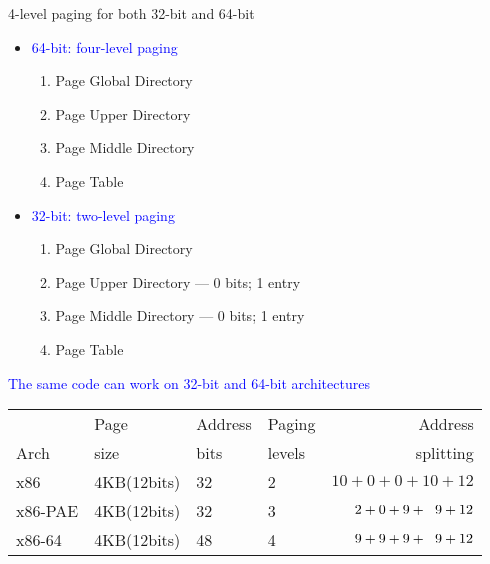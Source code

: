 \begin{frame}%
  \begin{block}{4-level paging for both 32-bit and 64-bit}
    \begin{itemize}
    \item \textcolor{blue}{64-bit: four-level paging}
      \begin{enumerate}
      \item Page Global Directory
      \item Page Upper Directory
      \item Page Middle Directory
      \item Page Table
      \end{enumerate}
    \item \textcolor{blue}{32-bit: two-level paging}
      \begin{enumerate}
      \item Page Global Directory
      \item Page Upper Directory --- 0 bits; 1 entry
      \item Page Middle Directory --- 0 bits; 1 entry
      \item Page Table
      \end{enumerate}
    \end{itemize}
    \textcolor{blue}{The same code can work on 32-bit and 64-bit architectures}
  \end{block}
    \begin{center}
    \begin{scriptsize}
      \begin{tabular}{llllr}
        \hline
        &Page &Address&Paging&Address\\
        Arch&size &bits &levels&splitting\\\hline
        x86 &4KB(12bits) &32 &2 &$10+0+0+10+12$\\\hline
        x86-PAE&4KB(12bits)&32&3&$2+0+9+\hspace{.6em}9+12$\\\hline
        x86-64&4KB(12bits)&48&4&$9+9+9+\hspace{.6em}9+12$\\\hline    
      \end{tabular}
    \end{scriptsize}
  \end{center}
\end{frame}

